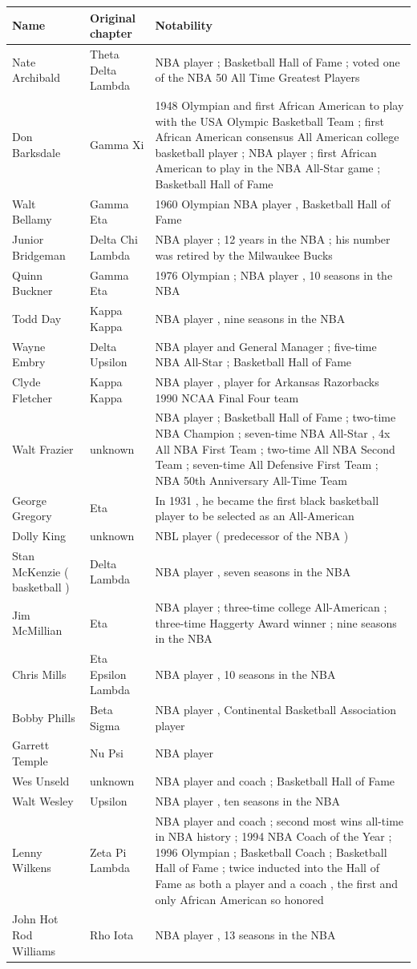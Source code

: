 \documentclass{article}
\begin{document}
\begin{tabular}{lll}
\toprule
Name & Original chapter & Notability \\
\midrule
Nate Archibald & Theta Delta Lambda & NBA player ; Basketball Hall of Fame ; voted one of the NBA 50 All Time Greatest Players \\
Don Barksdale & Gamma Xi & 1948 Olympian and first African American to play with the USA Olympic Basketball Team ; first African American consensus All American college basketball player ; NBA player ; first African American to play in the NBA All-Star game ; Basketball Hall of Fame \\
Walt Bellamy & Gamma Eta & 1960 Olympian NBA player , Basketball Hall of Fame \\
Junior Bridgeman & Delta Chi Lambda & NBA player ; 12 years in the NBA ; his number was retired by the Milwaukee Bucks \\
Quinn Buckner & Gamma Eta & 1976 Olympian ; NBA player , 10 seasons in the NBA \\
Todd Day & Kappa Kappa & NBA player , nine seasons in the NBA \\
Wayne Embry & Delta Upsilon & NBA player and General Manager ; five-time NBA All-Star ; Basketball Hall of Fame \\
Clyde Fletcher & Kappa Kappa & NBA player , player for Arkansas Razorbacks 1990 NCAA Final Four team \\
Walt Frazier & unknown & NBA player ; Basketball Hall of Fame ; two-time NBA Champion ; seven-time NBA All-Star , 4x All NBA First Team ; two-time All NBA Second Team ; seven-time All Defensive First Team ; NBA 50th Anniversary All-Time Team \\
George Gregory & Eta & In 1931 , he became the first black basketball player to be selected as an All-American \\
Dolly King & unknown & NBL player ( predecessor of the NBA ) \\
Stan McKenzie ( basketball ) & Delta Lambda & NBA player , seven seasons in the NBA \\
Jim McMillian & Eta & NBA player ; three-time college All-American ; three-time Haggerty Award winner ; nine seasons in the NBA \\
Chris Mills & Eta Epsilon Lambda & NBA player , 10 seasons in the NBA \\
Bobby Phills & Beta Sigma & NBA player , Continental Basketball Association player \\
Garrett Temple & Nu Psi & NBA player \\
Wes Unseld & unknown & NBA player and coach ; Basketball Hall of Fame \\
Walt Wesley & Upsilon & NBA player , ten seasons in the NBA \\
Lenny Wilkens & Zeta Pi Lambda & NBA player and coach ; second most wins all-time in NBA history ; 1994 NBA Coach of the Year ; 1996 Olympian ; Basketball Coach ; Basketball Hall of Fame ; twice inducted into the Hall of Fame as both a player and a coach , the first and only African American so honored \\
John Hot Rod Williams & Rho Iota & NBA player , 13 seasons in the NBA \\
\bottomrule
\end{tabular}
\end{document}
